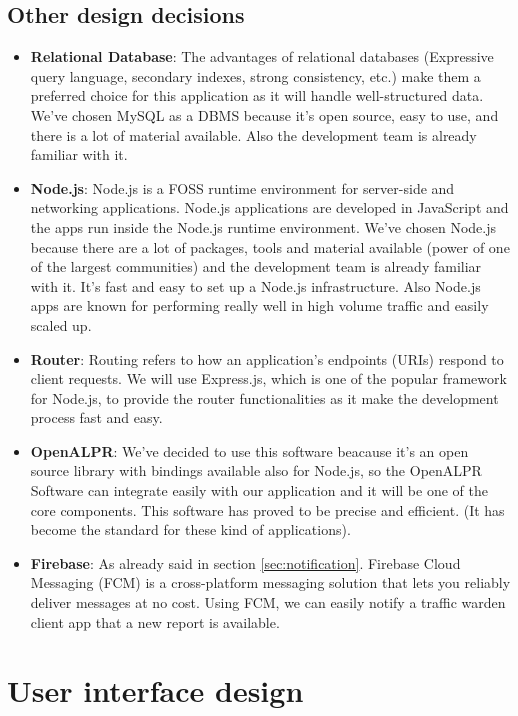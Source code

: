 \documentclass{article}
\begin{document}
\subsection{Other design decisions}
\begin{itemize}
\item \textbf{Relational Database}: The advantages of relational databases (Expressive query language, secondary indexes, strong consistency, etc.) make them a preferred choice for this application as it will handle well-structured data.\\
									We've chosen MySQL as a DBMS because it's open source, easy to use, and there is a lot of material available. Also the development team is already familiar with it.
\item \textbf{Node.js}: Node.js is a FOSS runtime environment for server-side and networking applications. Node.js applications are developed in JavaScript and the apps run inside the Node.js runtime environment.
				We've chosen Node.js because there are a lot of packages, tools and material available (power of one of the largest communities) and the development team is already familiar with it.
				It's fast and easy to set up a Node.js infrastructure. Also Node.js apps are known for performing really well in high volume traffic and easily scaled up.
\item \textbf{Router}: Routing refers to how an application’s endpoints (URIs) respond to client requests. We will use Express.js, which is one of the popular framework for Node.js, to provide the router functionalities as it make the development process fast and easy.
\item \textbf{OpenALPR}: We've decided to use this software beacause it's an open source library with bindings available also for Node.js,
				         so the OpenALPR Software can integrate easily with our application and it will be one of the core components.
						 This software has proved to be precise and efficient. (It has become the standard for these kind of applications).
\item \textbf{Firebase}: As already said in section \ref{sec:notification}. Firebase Cloud Messaging (FCM) is a cross-platform messaging solution that lets you reliably deliver messages at no cost.
						Using FCM, we can easily notify a traffic warden client app that a new report is available. 
\end{itemize}
\newpage

\section{User interface design}
\end{document}
